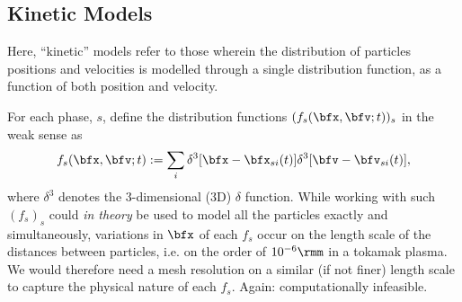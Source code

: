 \subsection{Kinetic Models}
    \line

    \begin{definition}\label{def:kinetic model}
        Here, ``kinetic'' models refer to those wherein the distribution of particles positions and velocities is modelled through a single distribution function, as a function of both position and velocity.
    \end{definition}
    
    \line

    For each phase, $s$, define the distribution functions $(f_{s}(\bfx, \bfv; t))_{s}$ in the weak sense as
    \begin{equation}\label{eqn:distribution function definition}
        f_{s}(\bfx, \bfv; t)  :=  \sum_{i}\delta^{3}[\bfx - \bfx_{si}(t)]\delta^{3}[\bfv - \bfv_{si}(t)],
    \end{equation}
    where $\delta^{3}$ denotes the 3-dimensional (3D) $\delta$ function. While working with such $(f_{s})_{s}$ could \emph{in theory} be used to model all the particles exactly and simultaneously, variations in $\bfx$ of each $f_{s}$ occur on the length scale of the distances between particles, i.e. on the order of $10^{- 6}\rmm$ in a tokamak plasma. We would therefore need a mesh resolution on a similar (if not finer) length scale to capture the physical nature of each $f_{s}$. Again: computationally infeasible.

